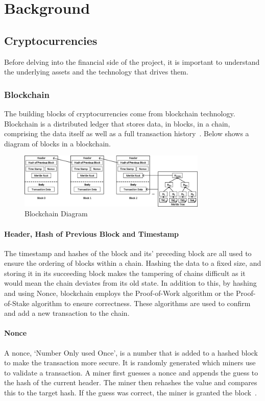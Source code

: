 \chapter{Background}
\section{Cryptocurrencies}
Before delving into the financial side of the project, it is important to understand the underlying assets and the technology that drives them.

\subsection{Blockchain}
The building blocks of cryptocurrencies come from blockchain technology. Blockchain is a distributed ledger that stores data, in blocks, in a chain, comprising the data itself as well as a full transaction history~\cite{nofer2017blockchain}. Below shows a diagram of blocks in a blockchain.

\begin{figure}[!htb]
    \centering
    \includegraphics[width=0.8\textwidth]{background/Images/The-structure-of-a-Blockchain.png}
    \caption{Blockchain Diagram~\cite{inbookBlockchain}}
\end{figure}

\subsubsection{Header, Hash of Previous Block and Timestamp}
The timestamp and hashes of the block and its' preceding block are all used to ensure the ordering of blocks within a chain. Hashing the data to a fixed size, and storing it in its succeeding block makes the tampering of chains difficult as it would mean the chain deviates from its old state. In addition to this, by hashing and using Nonce, blockchain employs the Proof-of-Work algorithm or the Proof-of-Stake algorithm to ensure correctness. These algorithms are used to confirm and add a new transaction to the chain.

\subsubsection{Nonce}
A nonce, `Number Only used Once', is a number that is added to a hashed block to make the transaction more secure. It is randomly generated which miners use to validate a transaction. A miner first guesses a nonce and appends the guess to the hash of the current header. The miner then rehashes the value and compares this to the target hash. If the guess was correct, the miner is granted the block~\cite{noauthor_components_2021}.

